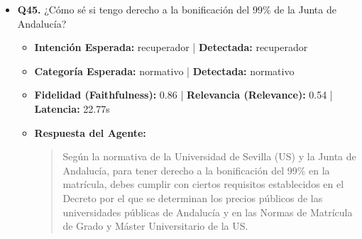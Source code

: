 \documentclass[12pt,a4paper,oneside]{report}
\begin{document}
\begin{itemize}
\begin{itemize}
\begin{quote}
Es importante tener en cuenta que la Universidad de Sevilla puede requerir documentación adicional o específica para ciertos trámites o situaciones, por lo que es recomendable consultar con la Secretaría Virtual o con el centro correspondiente para obtener información más detallada y actualizada. 

Cabe destacar que la normativa aplicable se encuentra en las "Normas de Matrícula Grado y Máster Universitario 2025-2026" de la Universidad de Sevilla, aprobadas por Resolución Rectoral de 27 de junio de 2025.
                \end{quote}
          \item \textbf{{Ground Truth (Referencia):}} \\
                \begin{quote}
El alumno debe identificarse mediante DNI, NIE, Pasaporte o la tarjeta de estudiante física/virtual emitida oficialmente por la US.
                \end{quote}
          \item \textbf{{Referencias / Fuentes Utilizadas:}} \\
                \begin{itemize}
                  \item R.R. NORMAS DE MATRICULA GRADO Y MASTER UNIVERSITARIO 2025-2026.pdf (Página 16)
                  \item R.R. NORMAS DE MATRICULA GRADO Y MASTER UNIVERSITARIO 2025-2026.pdf (Página 32)
                  \item R.R. NORMAS DE MATRICULA GRADO Y MASTER UNIVERSITARIO 2025-2026.pdf (Página 34)
                  \item R.R. NORMAS DE MATRICULA GRADO Y MASTER UNIVERSITARIO 2025-2026.pdf (Página 48)
                \end{itemize}
        \end{itemize}

  
\item \textbf{Q45.} ¿Cómo sé si tengo derecho a la bonificación del 99\% de la Junta de Andalucía? \\
        \begin{itemize}
          \item \textbf{Intención Esperada:} recuperador | \textbf{Detectada:} recuperador
          \item \textbf{Categoría Esperada:} normativo | \textbf{Detectada:} normativo
          \item \textbf{Fidelidad (Faithfulness):} 0.86 | \textbf{Relevancia (Relevance):} 0.54 | \textbf{Latencia:} 22.77s
          \item \textbf{{Respuesta del Agente:}} \\
                \begin{quote}
Según la normativa de la Universidad de Sevilla (US) y la Junta de Andalucía, para tener derecho a la bonificación del 99\% en la matrícula, debes cumplir con ciertos requisitos establecidos en el Decreto por el que se determinan los precios públicos de las universidades públicas de Andalucía y en las Normas de Matrícula de Grado y Máster Universitario de la US.


\end{quote}
\end{itemize}
\end{itemize}
\end{document}
